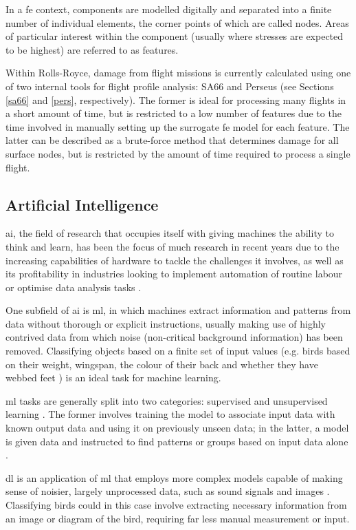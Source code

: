 In a \ac{fe} context, components are modelled digitally and separated into a finite number of individual elements, the corner points of which are called nodes. Areas of particular interest within the component (usually where stresses are expected to be highest) are referred to as features. 

Within Rolls-Royce, damage from flight missions is currently calculated using one of two internal tools for flight profile analysis: SA66 and Perseus (see Sections \ref{sa66} and \ref{pers}, respectively). The former is ideal for processing many flights in a short amount of time, but is restricted to a low number of features due to the time involved in manually setting up the surrogate \ac{fe} model for each feature. The latter can be described as a brute-force method that determines damage for all surface nodes, but is restricted by the amount of time required to process a single flight.

\subsection{Artificial Intelligence}
\ac{ai}, the field of research that occupies itself with giving machines the ability to think and learn, has been the focus of much research in recent years due to the increasing capabilities of hardware to tackle the challenges it involves, as well as its profitability in industries looking to implement automation of routine labour or optimise data analysis tasks \cite{goodfellow_deep_2016}.

One subfield of \ac{ai} is \ac{ml}, in which machines extract information and patterns from data without thorough or explicit instructions, usually making use of highly contrived data from which noise (non-critical background information) has been removed. Classifying objects based on a finite set of input values (e.g. birds based on their weight, wingspan, the colour of their back and whether they have webbed feet \cite{harrington_machine_2012}) is an ideal task for machine learning. 

\ac{ml} tasks are generally split into two categories: supervised and unsupervised learning \cite{kelleher_fundamentals_2015}. The former involves training the model to associate input data with known output data and using it on previously unseen data; in the latter, a model is given data and instructed to find patterns or groups based on input data alone \cite{goodfellow_deep_2016}.

\ac{dl} is an application of \ac{ml} that employs more complex models capable of making sense of noisier, largely unprocessed data, such as sound signals and images \cite{goodfellow_deep_2016}. Classifying birds could in this case involve extracting necessary information from an image or diagram of the bird, requiring far less manual measurement or input.

